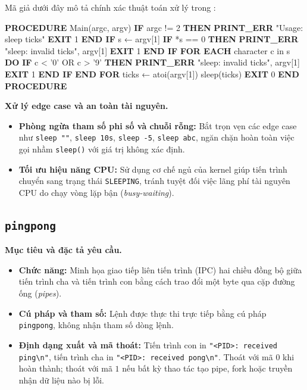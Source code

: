 \documentclass[12pt,a4paper]{article}
\newenvironment{algorithmblock}[1]{%
  \begin{tcolorbox}[
    enhanced,
    breakable,
    colback=white,
    colframe=primary!55,
    colbacktitle=primary,
    coltitle=white,
    boxrule=0.7pt,
    arc=2pt,
    left=10pt,right=10pt,top=7pt,bottom=8pt,
    title={#1},
    fonttitle=\small
  ]
}{%
  \end{tcolorbox}
}
\begin{document}
Mã giả dưới đây mô tả chính xác thuật toán xử lý trong :

\begin{algorithmblock}{\texttt{sleep}}
\begin{algorithmcode}
\textbf{PROCEDURE} Main(argc, argv)
    \textbf{IF} argc != 2 \textbf{THEN}
        \textbf{PRINT\_ERR} "Usage: sleep ticks"
        \textbf{EXIT} 1
    \textbf{END IF}
    s ← argv[1]
    \textbf{IF} *s == 0 \textbf{THEN}
        \textbf{PRINT\_ERR} "sleep: invalid ticks", argv[1]
        \textbf{EXIT} 1
    \textbf{END IF}
    \textbf{FOR EACH} character c in s \textbf{DO}
        \textbf{IF} c < '0' OR c > '9' \textbf{THEN}
            \textbf{PRINT\_ERR} "sleep: invalid ticks", argv[1]
            \textbf{EXIT} 1
        \textbf{END IF}
    \textbf{END FOR}
    ticks ← atoi(argv[1])
    sleep(ticks)
    \textbf{EXIT} 0
\textbf{END PROCEDURE}
\end{algorithmcode}
\end{algorithmblock}

\textbf{Xử lý edge case và an toàn tài nguyên.}
\begin{itemize}
  \item \textbf{Phòng ngừa tham số phi số và chuỗi rỗng:} Bắt trọn vẹn các edge case như \texttt{sleep ""}, \texttt{sleep 10s}, \texttt{sleep -5}, \texttt{sleep abc}, ngăn chặn hoàn toàn việc gọi nhầm \texttt{sleep()} với giá trị không xác định.
  \item \textbf{Tối ưu hiệu năng CPU:} Sử dụng cơ chế ngủ của kernel giúp tiến trình chuyển sang trạng thái \texttt{SLEEPING}, tránh tuyệt đối việc lãng phí tài nguyên CPU do chạy vòng lặp bận (\textit{busy-waiting}).
\end{itemize}

\subsection{\texttt{pingpong}}

\textbf{Mục tiêu và đặc tả yêu cầu.}
\begin{itemize}
  \item \textbf{Chức năng:} Minh họa giao tiếp liên tiến trình (IPC) hai chiều đồng bộ giữa tiến trình cha và tiến trình con bằng cách trao đổi một byte qua cặp đường ống (\textit{pipes}).
  \item \textbf{Cú pháp và tham số:} Lệnh được thực thi trực tiếp bằng cú pháp \texttt{pingpong}, không nhận tham số dòng lệnh.
  \item \textbf{Định dạng xuất và mã thoát:} Tiến trình con in \texttt{"<PID>: received ping\textbackslash n"}, tiến trình cha in \texttt{"<PID>: received pong\textbackslash n"}. Thoát với mã $0$ khi hoàn thành; thoát với mã $1$ nếu bất kỳ thao tác tạo pipe, fork hoặc truyền nhận dữ liệu nào bị lỗi.
\end{itemize}
\end{document}
